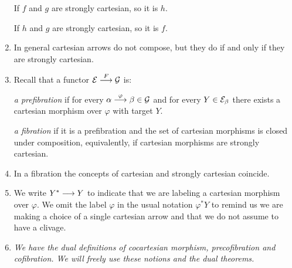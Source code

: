 \begin{sinnadastandard}
\begin{enumerate}
If $f$ and $g$ are strongly cartesian, so it is $h$.

If $h$ and $g$ are strongly cartesian, so it is $f$. 

\item In general cartesian arrows do not compose, but they do if and only if they are strongly cartesian.

\item Recall that a functor $\mathcal{E} \overset {F} {\longrightarrow} \mathcal{G}$ is:

\emph{a prefibration} 
 if for every ${\alpha \overset {\varphi} {\longrightarrow} \beta \in \mathcal{G}}$ and for every 
 ${Y \in \mathcal{E}_\beta}$ there exists a cartesian morphism over $\varphi$ with target $Y$.
 
\emph{a fibration} if it is a prefibration and the set of cartesian morphisms is closed under composition, equivalently, if cartesian morphisms are strongly cartesian.

 \item In a fibration the concepts of 
cartesian and strongly cartesian coincide.

\item  We write $Y^* \overset {} {\longrightarrow} Y$ to indicate that we are labeling a cartesian morphism over $\varphi$. We omit the label $\varphi$ in the usual notation  $\varphi^* Y$ to remind us we are making a choice of a single cartesian arrow and that we do not assume to have a clivage.

\item \emph{We have the dual definitions of cocartesian morphism, precofibration and cofibration. We will freely use these notions and the dual theorems.}

\end{enumerate}
\end{sinnadastandard}

